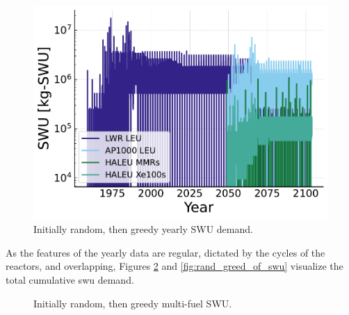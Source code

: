 \begin{figure}[H]
    \centering
    \includegraphics[scale=0.7]{images/results/swu/multi_drgng_swu_by_fuel.pdf}
    \caption{Initially random, then greedy yearly SWU demand.}
    \label{fig:swu_yearly_rand_greed}
\end{figure}

As the features of the yearly data are regular, dictated by the cycles of the reactors, and overlapping, Figures \ref{fig:rand_greed_mf_swu} and \ref{fig:rand_greed_of_swu} visualize the total cumulative \gls{swu} demand.


\begin{figure}[H]
  \hfill
  \caption{Initially random, then greedy multi-fuel SWU.}
  \label{fig:rand_greed_mf_swu}
\end{figure}



